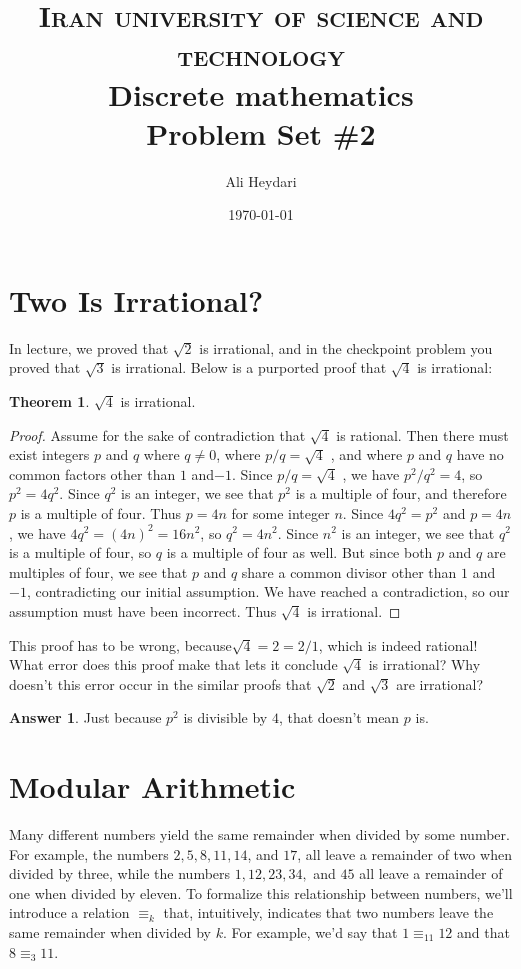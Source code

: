 \documentclass{article}
\title{
\textsc{Iran university of science and technology} \\ [25pt] %
Discrete mathematics\\Problem Set \#2 \\
}
\author{Ali Heydari}
\date{\today}
\renewcommand{\(}{\left(}
\renewcommand{\)}{\right)}
\theoremstyle{plain}
\theoremstyle{plain}
\theoremstyle{definition}
\newtheorem*{answer}{Answer}
\newtheorem{theorem}{Theorem}[section]
\begin{document}
\maketitle

\section{Two Is Irrational?}

In lecture, we proved that $\sqrt{2}$ is irrational, and in the checkpoint problem you proved that $\sqrt{3}$ is irrational.
Below is a purported proof that $\sqrt{4}$ is irrational:

\begin{theorem}
  $\sqrt{4}$  is irrational.
\end{theorem}
\begin{proof}
  Assume for the sake of contradiction that $\sqrt{4}$ is rational. Then there must exist
integers $p$ and $q$ where $ q \neq 0 $, where $p / q = \sqrt{4}$ , and where $p$ and $q$ have no
common factors other than $1$ and$ -1$.
Since $p / q = \sqrt{4}$ , we have $p^2 / q^2 = 4$, so $p^2 = 4q^2$. Since $q^2$ is an integer, we see
that $p^2$ is a multiple of four, and therefore $p$ is a multiple of four. Thus $p = 4n$
for some integer $n$.
Since $4q^2 = p^2$ and $p = 4n$, we have $4q^2 = (4n)^2 = 16n^2$, so $q^2 = 4n^2$. Since $n^2$ is an
integer, we see that $q^2$ is a multiple of four, so $q$ is a multiple of four as well.
But since both $p$ and $q$ are multiples of four, we see that $p$ and $q$ share a common
divisor other than $1$ and $-1$, contradicting our initial assumption. We have
reached a contradiction, so our assumption must have been incorrect. Thus $\sqrt{4}$
is irrational.
\end{proof}
This proof has to be wrong, because$ \sqrt{4} = 2 = 2/1$, which is indeed rational!
What error does this proof make that lets it conclude $\sqrt{4}$ is irrational? Why doesn't this error occur
in the similar proofs that $\sqrt{2}$ and $\sqrt{3}$ are irrational?
\begin{shaded}
\begin{answer}
Just because $p^2$ is divisible by $4$, that doesn't mean $p$ is.
\end{answer}
\end{shaded}

\section{Modular Arithmetic}
Many different numbers yield the same remainder when divided by some number. For example, the
numbers $2, 5, 8, 11, 14$, and $17$, all leave a remainder of two when divided by three, while the numbers
$1, 12, 23, 34,$ and $45$ all leave a remainder of one when divided by eleven. To formalize this relationship
between numbers, we'll introduce a relation $ \equiv_k $  that, intuitively, indicates that two numbers
leave the same remainder when divided by $k$. For example, we'd say that $1 \equiv_{11} 12 $ and that $8 \equiv_3 11$.
\end{document}
